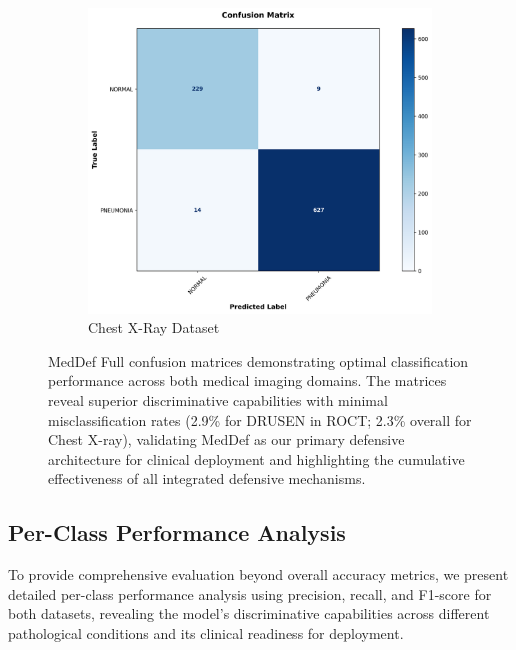 \documentclass[preprint,12pt]{elsarticle}
\begin{document}
\begin{figure}[!t]
\begin{subfigure}[b]{0.45\columnwidth}
\includegraphics[width=\columnwidth]{fig/cm/chest_xray/meddef1.png}
\caption{Chest X-Ray Dataset}
\label{fig:confusion_meddef_chest}
\end{subfigure}
\caption{MedDef Full confusion matrices demonstrating optimal classification performance across both medical imaging domains. The matrices reveal superior discriminative capabilities with minimal misclassification rates (2.9\% for DRUSEN in ROCT; 2.3\% overall for Chest X-ray), validating MedDef as our primary defensive architecture for clinical deployment and highlighting the cumulative effectiveness of all integrated defensive mechanisms.}
\label{fig:confusion_matrices_meddef}
\end{figure}

\subsection{Per-Class Performance Analysis}
To provide comprehensive evaluation beyond overall accuracy metrics, we present detailed per-class performance analysis using precision, recall, and F1-score for both datasets, revealing the model's discriminative capabilities across different pathological conditions and its clinical readiness for deployment.
\end{document}
